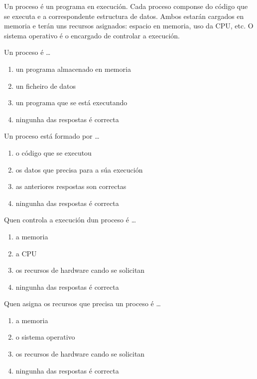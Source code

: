 Un proceso é un programa en execución. Cada proceso componse do código que se executa e a correspondente estructura de datos. Ambos estarán cargados en memoria e terán uns recursos asignados: espacio en memoria, uso da CPU, etc.  O sistema operativo é o encargado de controlar a execución.\\

\begin{diapo}\begin{frame}{Un proceso é \dots}
\begin{enumerate}
\item  un programa almacenado en memoria \pause
\item  un ficheiro de datos\pause
\item un programa que se está executando
\item ningunha das respostas é correcta
\end{enumerate} 
\end{frame} 
\end{diapo} 
\begin{diapo}\begin{frame}{Un proceso está formado por \dots}
\begin{enumerate}
\item  o código que se executou\pause
\item  os datos que precisa para a súa execución \pause
\item as anteriores respostas son correctas
\item ningunha das respostas é correcta
\end{enumerate} 
\end{frame} 
\end{diapo} 


\begin{diapo}\begin{frame}{Quen controla a execución dun proceso é \dots}
\begin{enumerate}
\item  a memoria \pause
\item  a CPU\pause
\item os recursos de hardware cando se solicitan
\item ningunha das respostas é correcta
\end{enumerate} 
\end{frame} 
\end{diapo} 
\begin{diapo}\begin{frame}{Quen asigna os recursos que precisa un proceso é \dots}
\begin{enumerate}
\item  a memoria \pause
\item  o sistema operativo \pause
\item os recursos de hardware cando se solicitan
\item ningunha das respostas é correcta
\end{enumerate} 
\end{frame} 
\end{diapo} 


